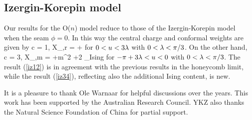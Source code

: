 \subsection{Izergin-Korepin model}

Our results for the O($n$) model reduce to those of the
Izergin-Korepin model when the seam $\phi=0$. 
In this way the central charge and conformal weights are given by 
\beq
c = 1, \quad X_{\ell,r} =
  +
  \label{iz12}
\eeq
for $0<u<3\lambda$ with  $0 <\lambda < \pi/3$. On the other hand,
\beq
c = {3}, \quad X_{\ell,m} =
  +{m^2\pi\lam} +2 \Delta_{\rm Ising} \label{iz34}
\eeq
for $-\pi+3\lambda<u<0$ with $0< \lambda < \pi/3$. 
%
The result (\ref{iz12}) is in agreement with the previous results in
the honeycomb limit, while the result (\ref{iz34}), reflecting also the
additional Ising content, is new. 

\vskip 0.5cm



It is a pleasure to thank Ole Warnaar for helpful discussions 
over the years. 
This work has been supported by the Australian Research Council.
YKZ also thanks the Natural Science Foundation of China
for partial support.


